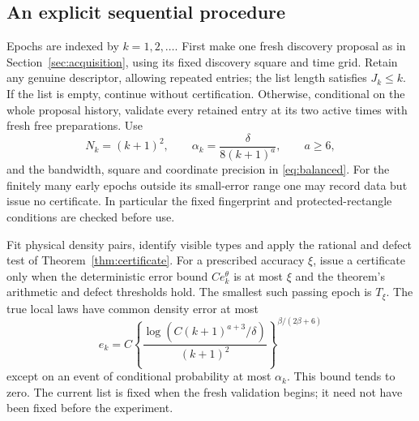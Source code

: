 \subsection{An explicit sequential procedure}
Epochs are indexed by $k=1,2,\ldots$. First make one fresh discovery
proposal as in Section~\ref{sec:acquisition}, using its fixed discovery
square and time grid. Retain any genuine descriptor, allowing repeated
entries; the list length satisfies $J_k\le k$. If the list is empty,
continue without certification. Otherwise, conditional on the whole
proposal history, validate every retained entry at its two active times
with fresh free preparations. Use
\begin{equation}\label{eq:schedule}
 N_k=(k+1)^2,\qquad
 \alpha_k=\frac{\delta}{8(k+1)^a},\qquad a\ge6,
\end{equation}
and the bandwidth, square and coordinate precision in \eqref{eq:balanced}.
For the finitely many early epochs outside its small-error range one
may record data but issue no certificate. In particular the fixed
fingerprint and protected-rectangle conditions are checked before use.

Fit physical density pairs, identify visible types and apply the rational
and defect test of Theorem~\ref{thm:certificate}. For a prescribed
accuracy $\xi$, issue a certificate only when the deterministic error
bound $Ce_k^\theta$ is at most $\xi$ and the theorem's arithmetic and
defect thresholds hold. The smallest such passing epoch is $T_\xi$.
The true local laws have common density error at most
\begin{equation}\label{eq:epoch-error}
 e_k=C\left\{\frac{\log(C(k+1)^{a+3}/\delta)}{(k+1)^2}
                              \right\}^{\beta/(2\beta+6)}
\end{equation}
except on an event of conditional probability at most $\alpha_k$.
This bound tends to zero. The current list is fixed when the fresh
validation begins; it need not have been fixed before the experiment.

